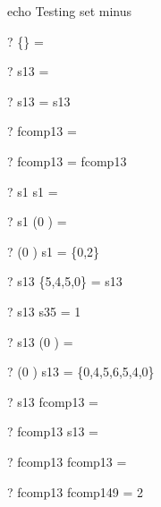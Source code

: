 echo     Testing set minus
\begin{zed} \vdash?  \{\}      \setminus \emptyset   = \emptyset \end{zed}
\begin{zed} \vdash?  \emptyset \setminus s13         = \emptyset \end{zed}
\begin{zed} \vdash?  s13       \setminus \emptyset   = s13 \end{zed}
\begin{zed} \vdash?  \emptyset \setminus fcomp13     = \emptyset \end{zed}
\begin{zed} \vdash?  fcomp13   \setminus \emptyset   = fcomp13 \end{zed}
\begin{zed} \vdash?  s1        \setminus s1          = \emptyset \end{zed}
\begin{zed} \vdash?  s1        \setminus (0 ) = \emptyset \end{zed}
\begin{zed} \vdash?  (0 ) \setminus s1        = \{0,2\} \end{zed}
\begin{zed} \vdash?  s13       \setminus \{5,4,5,0\} = s13 \end{zed}
\begin{zed} \vdash?  s13       \setminus s35         = 1  \end{zed}
\begin{zed} \vdash?  s13       \setminus (0 ) = \emptyset \end{zed}
\begin{zed} \vdash?  (0 ) \setminus s13 = \{0,4,5,6,5,4,0\}\end{zed}
\begin{zed} \vdash?  s13       \setminus fcomp13     = \emptyset \end{zed}
\begin{zed} \vdash?  fcomp13   \setminus s13         = \emptyset \end{zed}
\begin{zed} \vdash?  fcomp13   \setminus fcomp13     = \emptyset \end{zed}
\begin{zed} \vdash?  fcomp13   \setminus fcomp149    = 2  \end{zed}


